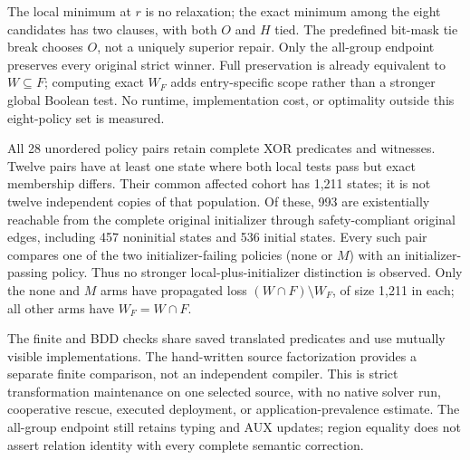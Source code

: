 The local minimum at $r$ is no relaxation; the exact minimum among
the eight candidates has two clauses, with both $O$ and $H$ tied.
The predefined bit-mask tie break chooses $O$, not a uniquely superior
repair. Only the all-group endpoint preserves every original strict
winner. Full preservation is already equivalent to $W\subseteq F$;
computing exact $W_F$ adds entry-specific scope rather than a stronger
global Boolean test. No runtime, implementation cost, or optimality
outside this eight-policy set is measured.

All 28 unordered policy pairs retain complete XOR predicates and
witnesses. Twelve pairs have at least one state where both local tests
pass but exact membership differs. Their common affected cohort has
1,211 states; it is not twelve independent copies of that population.
Of these, 993 are existentially reachable from the complete original
initializer through safety-compliant original edges, including 457
noninitial states and 536 initial states. Every such pair compares
one of the two initializer-failing policies (none or $M$) with an
initializer-passing policy. Thus no stronger local-plus-initializer
distinction is observed. Only the none and $M$ arms have propagated
loss $(W\cap F)\setminus W_F$, of size 1,211 in each; all other arms
have $W_F=W\cap F$.

The finite and BDD checks share saved translated predicates and use
mutually visible implementations. The hand-written source factorization
provides a separate finite comparison, not an independent compiler.
This is strict transformation maintenance on one selected source, with
no native solver run, cooperative rescue, executed deployment, or
application-prevalence estimate. The all-group endpoint still retains
typing and AUX updates; region equality does not assert relation
identity with every complete semantic correction.
